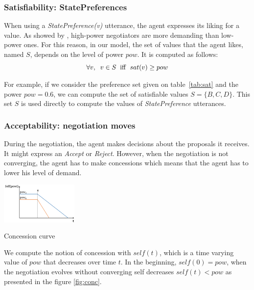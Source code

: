 \documentclass[sigconf]{aamas}  %
\begin{document}
	\subsubsection{Satisfiability: StatePreferences}
	\label{sec:sat}
	When using a \emph{StatePreference(v)} utterance, the agent expresses its liking for a value. As showed by \cite{de1995impact}, high-power negotiators are more demanding than low-power ones. For this reason, in our model, the set of values that the agent likes, named $S$, depends on the level of power $pow$. It is computed as follows:
	\begin{equation}
	\forall v,\hspace{2mm} v\in S\hspace{2mm}\mathrm{iff}\hspace{2mm}sat(v) \geq pow
	\end{equation}
	
	For example, if we consider the preference set given on table~\ref{tab:sat} and the power $pow=0.6$, we can compute the set of satisfiable values $S = \{B, C, D\}$. This set $S$ is used directly to compute the values of \emph{StatePreference} utterances.	
	
	\subsubsection{Acceptability: negotiation moves}
	During the negotiation, the agent makes decisions about the proposals it receives. It might express an \emph{Accept} or \emph{Reject}. However, when the negotiation is not converging, the agent has to make concessions which means that the agent has to lower his level of demand.
	
		\begin{floatingfigure}[r]{1.5in}
			\includegraphics[width=1.5in]{figs/sv3.png}
			\caption{\label{fig:conc}Concession curve}
		\end{floatingfigure} 
		
	We compute the notion of concession with $self(t)$, which is a time varying value of $pow$ that decreases over time $t$. In the beginning, $self(0) = pow$, when the negotiation evolves without converging self decreases $self(t) < pow$ as presented in the figure \ref{fig:conc}.
	
\end{document}
